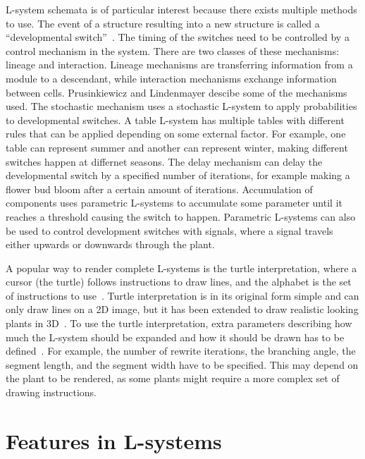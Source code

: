 L-system schemata is of particular interest because there exists multiple methods to use.
The event of a structure resulting into a new structure is called a ``developmental switch''~\cite{Prusinkiewicz2012}.
The timing of the switches need to be controlled by a control mechanism in the system.
There are two classes of these mechanisms: lineage and interaction.
Lineage mechanisms are transferring information from a module to a descendant, while interaction mechanisms exchange information between cells.
Prusinkiewicz and Lindenmayer descibe some of the mechanisms used.
The stochastic mechanism uses a stochastic L-system to apply probabilities to developmental switches.
A table L-system has multiple tables with different rules that can be applied depending on some external factor.
For example, one table can represent summer and another can represent winter, making different switches happen at differnet seasons.
The delay mechanism can delay the developmental switch by a specified number of iterations, for example making a flower bud bloom after a certain amount of iterations.
Accumulation of components uses parametric L-systems to accumulate some parameter until it reaches a threshold causing the switch to happen.
Parametric L-systems can also be used to control development switches with signals, where a signal travels either upwards or downwards through the plant.~\cite{Prusinkiewicz2012}

A popular way to render complete L-systems is the turtle interpretation, where a cursor (the turtle) follows instructions to draw lines, and the alphabet is the set of instructions to use~\cite{Prusinkiewicz2012}.
Turtle interpretation is in its original form simple and can only draw lines on a 2D image, but it has been extended to draw realistic looking plants in 3D~\cite{Prusinkiewicz1988}.
To use the turtle interpretation, extra parameters describing how much the L-system should be expanded and how it should be drawn has to be defined~\cite{Prusinkiewicz2012}.
For example, the number of rewrite iterations, the branching angle, the segment length, and the segment width have to be specified.
This may depend on the plant to be rendered, as some plants might require a more complex set of drawing instructions.

\section{Features in L-systems}